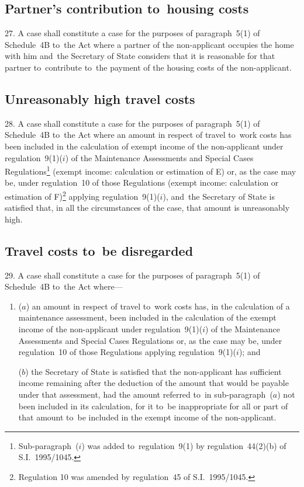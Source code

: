 \documentclass[12pt,a4paper]{article}
\begin{document}
\subsection[27. Partner’s contribution to~housing costs]{Partner’s contribution to~housing costs}

27. A case shall constitute a case for
the purposes of paragraph~5(1) of Schedule~4B to~the Act where a partner of the
non-applicant occupies the home with him and~the Secretary of State considers
that it is reasonable for that partner to~contribute to~the payment of the
housing costs of the non-applicant.

\subsection[28. Unreasonably high travel costs]{Unreasonably high travel costs}

28. A case shall constitute a case for the
purposes of paragraph~5(1) of Schedule~4B to~the Act where an amount in respect
of travel to~work costs has been included in the calculation of exempt income of
the non-applicant under regulation~9(1)($i$) of the Maintenance Assessments and
Special Cases Regulations\footnote{\frenchspacing Sub-paragraph~($i$) was added to~regulation~9(1) by regulation~44(2)(b) of S.I.~1995/1045.} (exempt income: calculation or estimation of E)
or, as the case may be, under regulation~10 of those Regulations (exempt income:
calculation or estimation of F)\footnote{\frenchspacing Regulation 10 was amended by regulation~45 of S.I.~1995/1045.} applying regulation~9(1)($i$), and~the
Secretary of State is satisfied that, in all the circumstances of the case, that
amount is unreasonably high.

\subsection[29. Travel costs to~be disregarded]{Travel costs to~be disregarded}

29. A case shall constitute a case for the
purposes of paragraph~5(1) of Schedule~4B to~the Act where—
\begin{enumerate}\item[]
($a$) an amount in respect of travel to~work costs has, in the calculation of a
maintenance assessment, been included in the calculation of the exempt income of
the non-applicant under regulation~9(1)($i$) of the Maintenance Assessments and
Special Cases Regulations or, as the case may be, under regulation~10 of those
Regulations applying regulation~9(1)($i$); and

($b$) the Secretary of State is satisfied that the non-applicant has sufficient
income remaining after the deduction of the amount that would be payable under
that assessment, had the amount referred to~in sub-paragraph~($a$) not been
included in its calculation, for it to~be inappropriate for all or part of that
amount to~be included in the exempt income of the non-applicant.
\end{enumerate}
\end{document}
